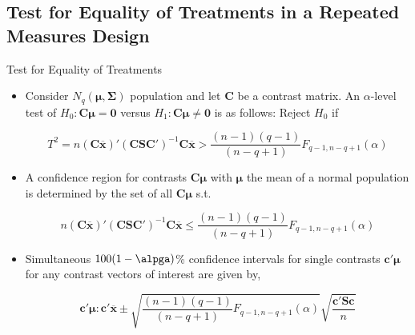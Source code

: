 \documentclass[8pt]{beamer}
\begin{document}
\subsection{Test for Equality of Treatments in a Repeated Measures Design}
    \begin{frame}{Test for Equality of Treatments}
        \begin{itemize}
            \item Consider $N_{q}(\mathbf{\mu, \Sigma})$ population and let $\mathbf{C}$ be a contrast matrix. An $\alpha$-level test of $H_{0}:\mathbf{C\mu = 0}$ versus $H_{1}:\mathbf{C\mu \neq 0}$ is as follows: Reject $H_{0}$ if
            
            \begin{equation}
                T^{2} = n(\mathbf{C\overline{x}})'(\mathbf{CSC'})^{-1}\mathbf{C\overline{x}} > \frac{(n - 1)(q - 1)}{(n - q + 1)}F_{q-1,n-q+1}(\alpha)
            \end{equation}
            
            \item A confidence region for contrasts $\mathbf{C\mu}$ with $\mathbf{\mu}$ the mean of a normal population is determined by the set of all $\mathbf{C\mu}$ s.t. 
            
            \begin{equation}
                n(\mathbf{C\overline{x}})'(\mathbf{CSC'})^{-1}\mathbf{C\overline{x}} \leq \frac{(n - 1)(q - 1)}{(n - q + 1)}F_{q-1,n-q+1}(\alpha)
            \end{equation}
            
            \item Simultaneous $100(1-\alpga)$\% confidence intervals for single contrasts $\mathbf{c'\mu}$ for any contrast vectors of interest are given by, 
            
            \begin{equation}
                \mathbf{c'\mu}: \mathbf{c'\overline{x}} \pm \sqrt{\frac{(n - 1)(q - 1)}{(n - q + 1)}F_{q-1,n-q+1}(\alpha)}\sqrt{\frac{\mathbf{c'Sc}}{n}}
            \end{equation}
        \end{itemize}
    \end{frame}
    
\end{document}
